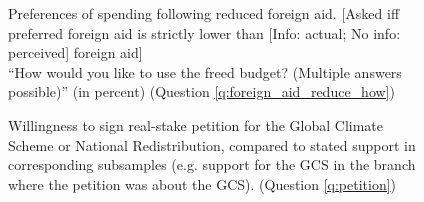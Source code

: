 \documentclass[12pt,english]{article}
\begin{document}
\begin{figure}[h!]
    \caption[Preferences of spending following reduced foreign aid]{Preferences of spending following reduced foreign aid. [Asked iff preferred foreign aid is strictly lower than [Info: actual; No info: perceived] foreign aid] \\ ``How would you like to use the freed budget? (Multiple answers possible)'' (in percent) (Question \ref{q:foreign_aid_reduce_how})}\label{fig:foreign_aid_reduce_how}
\end{figure}





\begin{figure}[h!]
    \caption[Willingness to sign a real-stake petition]{Willingness to sign real-stake petition for the Global Climate Scheme or National Redistribution, compared to stated support in corresponding subsamples (e.g. support for the GCS in the branch where the petition was about the GCS). (Question \ref{q:petition})}\label{fig:petition}
\end{figure}
\end{document}
